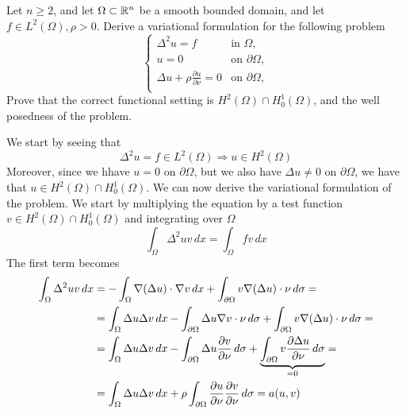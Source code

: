 \newpage
\begin{exercise}
    Let \(n \geq 2\), and let \(\Omega \subset \mathbb{R}^n\) be a smooth bounded domain, and let \(f \in L^2(\Omega), \rho > 0\). Derive a variational formulation for the following problem
    \begin{equation*}
        \begin{cases}
            \Delta^2 u = f                                      & \text{in } \Omega,          \\
            u = 0                                               & \text{on } \partial \Omega, \\
            \Delta u + \rho \frac{\partial u}{\partial \nu} = 0 & \text{on } \partial \Omega, \\
        \end{cases}
    \end{equation*}
    Prove that the correct functional setting is \(H^2(\Omega) \cap H^1_0(\Omega)\), and the well posedness of the problem.
\end{exercise}
We start by seeing that
\[
    \Delta^2 u = f \in L^2(\Omega) \Rightarrow u \in H^2(\Omega)
\]
Moreover, since we hhave \(u = 0\) on \(\partial \Omega\), but we also have
\(\Delta u \neq 0\) on \(\partial \Omega\), we have that \(u \in H^2(\Omega)
\cap H^1_0(\Omega)\). We can now derive the variational formulation of the
problem. We start by multiplying the equation by a test function \(v \in
H^2(\Omega) \cap H^1_0(\Omega)\) and integrating over \(\Omega\)
\[
    \int_\Omega \Delta^2 u v \, dx = \int_\Omega f v \, dx
\]
The first term becomes
\begin{align*}
    \int_\Omega \Delta^2 u v \, dx & = - \int_\Omega \nabla(\Delta u) \cdot \nabla v \, dx + \int_{\partial \Omega} v \nabla(\Delta u) \cdot \nu \, d\sigma =                                                                                               \\
                                   & = \int_\Omega \Delta u \Delta v \, dx - \int_{\partial \Omega} \Delta u \nabla v \cdot \nu \, d\sigma + \int_{\partial \Omega} v \nabla(\Delta u) \cdot \nu \, d\sigma =                                              \\
                                   & = \int_\Omega \Delta u \Delta v \, dx - \int_{\partial \Omega} \Delta u \frac{\partial v}{\partial \nu} \, d\sigma + \underbrace{\int_{\partial \Omega} v \frac{\partial \Delta u}{\partial \nu} \, d\sigma}_{=0} = \\
                                   & = \int_\Omega \Delta u \Delta v \, dx + \rho \int_{\partial \Omega} \frac{\partial u}{\partial \nu} \frac{\partial v}{\partial \nu} \, d\sigma = a(u, v)
\end{align*}
